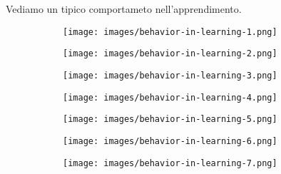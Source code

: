 Vediamo un tipico comportameto nell'apprendimento.
\begin{figure}[h!]
    \centering
    \begin{subfigure}{0.32\textwidth}
        \centering
        \texttt{[image: images/behavior-in-learning-1.png]}
    \end{subfigure}
    \begin{subfigure}{0.32\textwidth}
        \centering
        \texttt{[image: images/behavior-in-learning-2.png]}
    \end{subfigure}
    \begin{subfigure}{0.32\textwidth}
        \centering
        \texttt{[image: images/behavior-in-learning-3.png]}
    \end{subfigure}
\end{figure}
\begin{figure}[h!]
    \centering
    \begin{subfigure}{0.4\textwidth}
        \centering
        \texttt{[image: images/behavior-in-learning-4.png]}
    \end{subfigure}
    \begin{subfigure}{0.4\textwidth}
        \centering
        \texttt{[image: images/behavior-in-learning-5.png]}
    \end{subfigure}
\end{figure}
\begin{figure}[h!]
    \centering
    \begin{subfigure}{0.4\textwidth}
        \centering
        \texttt{[image: images/behavior-in-learning-6.png]}
    \end{subfigure}
    \begin{subfigure}{0.4\textwidth}
        \centering
        \texttt{[image: images/behavior-in-learning-7.png]}
    \end{subfigure}
\end{figure}

\newpage
